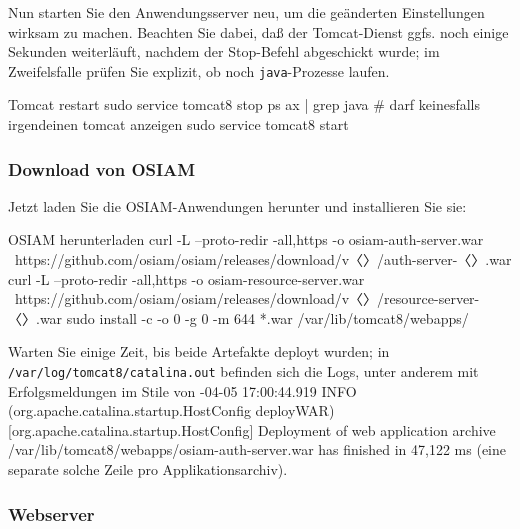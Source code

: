 \documentclass{tarentanleitung}
\newcommand{\vwiaversosiam}{2.5}
\begin{document}
Nun starten Sie den Anwendungsserver neu, um die geänderten
Einstellungen wirksam zu machen. Beachten Sie dabei, daß der
Tomcat-Dienst ggfs. noch einige Sekunden weiterläuft, nachdem
der Stop-Befehl abgeschickt wurde; im Zweifelsfalle prüfen Sie
explizit, ob noch \texttt{java}-Prozesse laufen.\keinumbruch

\begin{minipage}{\linewidth}
\begin{lstdump}{Tomcat restart}
sudo service tomcat8 stop
ps ax | grep java               # darf keinesfalls irgendeinen tomcat anzeigen
sudo service tomcat8 start
\end{lstdump}
\end{minipage}

\subsubsection{Download von OSIAM}\label{subsubsec:setup-osiam-download}

\begin{minipage}{\linewidth}
Jetzt laden Sie die OSIAM-Anwendungen herunter und installieren Sie sie:

\begin{lstdump}{OSIAM herunterladen}
curl -L --proto-redir -all,https -o osiam-auth-server.war \
    https://github.com/osiam/osiam/releases/download/v〈\lstdumpesc{\vwiaversosiam}〉/auth-server-〈\lstdumpesc{\vwiaversosiam}〉.war
curl -L --proto-redir -all,https -o osiam-resource-server.war \
    https://github.com/osiam/osiam/releases/download/v〈\lstdumpesc{\vwiaversosiam}〉/resource-server-〈\lstdumpesc{\vwiaversosiam}〉.war
sudo install -c -o 0 -g 0 -m 644 *.war /var/lib/tomcat8/webapps/
\end{lstdump}
\end{minipage}

Warten Sie einige Zeit, bis beide Artefakte deployt wurden; in
\texttt{/var/log/tomcat8/catalina.out} befinden sich die Logs,
unter anderem mit Erfolgsmeldungen im Stile von {\ttfamily
2018-04-05 17:00:44.919    INFO
(org.apache.catalina.startup.HostConfig deployWAR)
[org.apache.catalina.startup.HostConfig] Deployment of web application archive
/var/lib/tomcat8/webapps/osiam-auth-server.war has finished in 47,122 ms}
(eine separate solche Zeile pro Applikationsarchiv).

\subsubsection{Webserver}\label{subsubsec:setup-osiam-apache}
\end{document}
